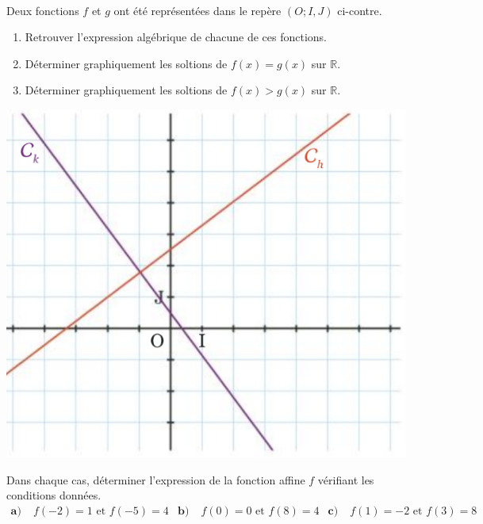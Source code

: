 \documentclass[11pt]{article}
\begin{document}
\begin{exo}~\\
\begin{minipage}[]{.7\textwidth}
  Deux fonctions $f$ et $g$ ont été représentées dans le repère $(O; I, J)$
  ci-contre.
  \begin{enumerate}
    \item Retrouver l'expression algébrique de chacune de ces fonctions.
    \item Déterminer graphiquement les soltions de $f(x)=g(x)$ sur $\mathbb{R}$.
    \item Déterminer graphiquement les soltions de $f(x)>g(x)$ sur $\mathbb{R}$.
  \end{enumerate}
\end{minipage}
\begin{minipage}[]{.3\textwidth}
  \begin{center}
    \includegraphics[scale=.25]{exo4.png}
  \end{center}
\end{minipage}
\end{exo}

\begin{exo}
Dans chaque cas, déterminer l'expression de la fonction
affine $f$ vérifiant les conditions données.
\begin{align*}
  \textbf{a)}\;& f(-2)=1\text{ et }f(-5)=4 &
  \textbf{b)}\;& f(0)=0\text{ et }f(8)=4 &
  \textbf{c)}\;& f(1)=-2\text{ et }f(3)=8
\end{align*}
\end{exo}
\end{document}
